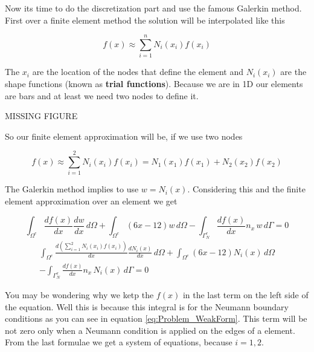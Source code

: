 \documentclass[letterpaper,10pt]{article}
\begin{document}
Now its time to do the discretization part and use the famous Galerkin method. First over a finite element method the solution will be interpolated like this

\begin{equation}
f(x) \approx \sum_{i=1}^n N_i(x_i) f(x_i)
\end{equation}

The $x_i$ are the location of the nodes that define the element and $N_i(x_i)$ are the shape functions (known as \textbf{trial functions}). Because we are in 1D our elements are bars and at least we need two nodes to define it.

MISSING FIGURE

So our finite element approximation will be, if we use two nodes

\[
f(x) \approx \sum_{i=1}^2 N_i(x_i) f(x_i) = N_1(x_1) f(x_1) + N_2(x_2) f(x_2)
\]

The Galerkin method implies to use $w=N_i(x)$. Considering this and the finite element approximation over an element we get

\begin{small}
\[
\int_{\Omega^e} \frac{d f(x)}{d x} \frac{d w}{d x} \, d\Omega + \int_{\Omega^e} (6x-12) w \, d\Omega - \int_{\Gamma_N^e} \frac{d f(x)}{d x} n_x \, w \, d\Gamma = 0
\]
\begin{multline}
\int_{\Omega^e} \frac{d \left( \sum_{i=1}^2 N_i(x_i)  f(x_i) \right) }{d x} \frac{d N_i(x)}{d x} \, d\Omega + \int_{\Omega^e} (6x-12) N_i(x)\, d\Omega \\
- \int_{\Gamma_N^e} \frac{d f(x)}{d x} n_x \, N_i(x) \, d\Gamma = 0
\end{multline}
\end{small}

You may be wondering why we ketp the $f(x)$ in the last term on the left side of the equation. Well this is because this integral is for the Neumann boundary conditions as you can see in equation \ref{eq:Problem_WeakForm}. This term will be not zero only when a Neumann condition is applied on the edges of a element. From the last formulae we get a system of equations, because $i=1,2$.
\end{document}
